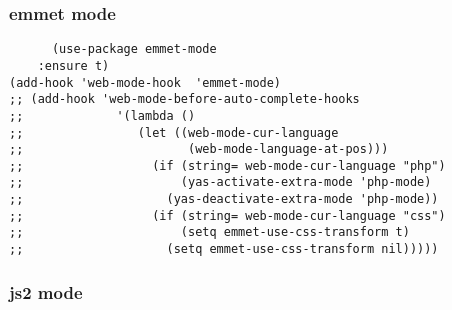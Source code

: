 \documentclass[11pt]{article}
\begin{document}
\subsubsection*{emmet mode}
\label{sec:org754b9fd}
\begin{verbatim}
      (use-package emmet-mode
	:ensure t)
(add-hook 'web-mode-hook  'emmet-mode)
;; (add-hook 'web-mode-before-auto-complete-hooks
;;             '(lambda ()
;;                (let ((web-mode-cur-language
;;                       (web-mode-language-at-pos)))
;;                  (if (string= web-mode-cur-language "php")
;;                      (yas-activate-extra-mode 'php-mode)
;;                    (yas-deactivate-extra-mode 'php-mode))
;;                  (if (string= web-mode-cur-language "css")
;;                      (setq emmet-use-css-transform t)
;;                    (setq emmet-use-css-transform nil)))))
\end{verbatim}
\subsubsection*{js2 mode}
\label{sec:orgcfe8970}
\end{document}
